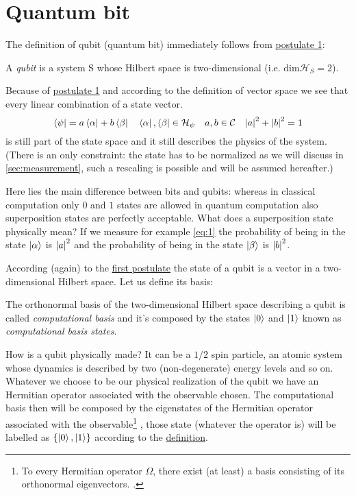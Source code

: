 \section{Quantum bit}
The definition of qubit (quantum bit) immediately follows from \hyperref[postulate:1]{postulate 1}:
\begin{defn}
A \emph{qubit} is a system S whose Hilbert space is two-dimensional (i.e. $\text{dim}\mathcal{H}_S = 2$).
\end{defn}
Because of \hyperref[postulate:1]{postulate 1} and according to the definition of vector space we see that every linear combination of a state vector.
\begin{equation}\label{eq:1}
    \bra{\psi} = a \bra{\alpha} + b \bra{\beta} \quad \bra{\alpha},\bra{\beta} \in \mathcal{H}_\psi \quad a,b \in \mathcal{C} \quad \abs{a}^2 + \abs{b}^2 = 1
\end{equation}
is still part of the state space and it still describes the physics of the system. (There is an only constraint: the state has to be normalized as we will discuss in \ref{sec:measurement}, such a rescaling is possible and will be assumed hereafter.) 

Here lies the main difference between bits and qubits: whereas in classical computation only $0$ and $1$ states are allowed in quantum computation also superposition states are perfectly acceptable. What does a superposition state physically mean? If we measure for example \ref{eq:1} the probability of being in the state $\ket{\alpha}$ is  $\abs{a}^2$ and the probability of being in the state $\ket{\beta}$ is $\abs{b}^2$.

According (again) to the \hyperref[postulate:1]{first postulate} the state of a qubit is a vector in a two-dimensional Hilbert space. Let us define its basis:
\begin{defn}\label{def:computational-basis}
The orthonormal basis of the two-dimensional Hilbert space describing a qubit is called \emph{computational basis} and it's composed by the states $\ket{0}$ and $\ket{1}$ known as \emph{computational basis states}.
\end{defn}
How is a qubit physically made?
It can be a $1/2$ spin particle, an atomic system whose dynamics is described by two (non-degenerate) energy levels and so on.
Whatever we choose to be our physical realization of the qubit we have an Hermitian operator associated with the observable chosen. The computational basis then will be composed by the eigenstates of the Hermitian operator associated with the observable\footnote{To every Hermitian operator $\Omega$, there exist (at least) a basis consisting of its orthonormal eigenvectors. \cite[p.36]{Shankar}.} , those state (whatever the operator is) will be labelled as $\{\ket{0},\ket{1}\}$ according to the \hyperref[def:computational-basis]{definition}.

